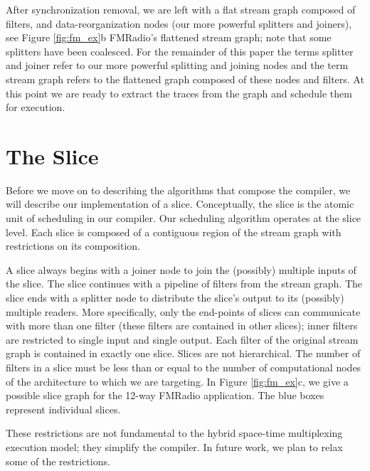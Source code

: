 After synchronization removal, we are left with a flat stream graph
composed of filters, and data-reorganization nodes (our more powerful
splitters and joiners), see Figure \ref{fig:fm_ex}b FMRadio's
flattened stream graph; note that some splitters have been
coalesced. For the remainder of this paper the terms splitter and
joiner refer to our more powerful splitting and joining nodes and the
term stream graph refers to the flattened graph composed of these
nodes and filters.  At this point we are ready to extract the traces
from the graph and schedule them for execution.




\section{The Slice}
Before we move on to describing the algorithms that compose the
compiler, we will describe our implementation of a
slice. Conceptually, the slice is the atomic unit of scheduling in our
compiler.  Our scheduling algorithm operates at the slice level.
Each slice is composed of a contiguous region of the stream
graph with restrictions on its composition. 

A slice always begins with a joiner node to join the (possibly)
multiple inputs of the slice.  The slice continues with a pipeline of
filters from the stream graph.  The slice ends with a splitter node to
distribute the slice's output to its (possibly) multiple readers.
More specifically, only the end-points of slices can communicate with
more than one filter (these filters are contained in other slices);
inner filters are restricted to single input and single output.  Each
filter of the original stream graph is contained in exactly one slice.
Slices are not hierarchical.  The number of filters in a slice must be
less than or equal to the number of computational nodes of the
architecture to which we are targeting.  In Figure \ref{fig:fm_ex}c,
we give a possible slice graph for the 12-way FMRadio application.
The blue boxes represent individual slices.

These restrictions are not fundamental to the hybrid space-time
multiplexing execution model; they simplify the compiler.  In future
work, we plan to relax some of the restrictions.

